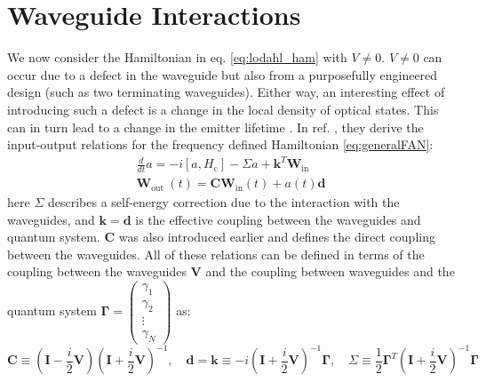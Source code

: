 \section{Waveguide Interactions \label{sec:waveguideIO}}
We now consider the Hamiltonian in eq. \eqref{eq:lodahl_ham} with $V \neq 0$. $V \neq 0$ can occur due to a defect in the waveguide but also from a purposefully engineered design (such as two terminating waveguides). Either way, an interesting effect of introducing such a defect is a change in the local density of optical states. This can in turn lead to a change in the emitter lifetime \cite{Joanesarson2020Few-photonGeometries}. In ref. \cite{Xu2016FanoTransport}, they derive the input-output relations for the frequency defined Hamiltonian \eqref{eq:generalFAN}:  
\begin{equation}
\begin{gathered}
\frac{d}{d t} a=-i\left[a, H_{\mathrm{c}}\right]-\Sigma a+\mathbf{k}^T \mathbf{W}_{\mathrm{in}} \\
\mathbf{W}_{\text {out }}(t)=\mathbf{C} \mathbf{W}_{\mathrm{in}}(t)+a(t)\mathbf{d}
\end{gathered}
\end{equation}
here $\Sigma$ describes a self-energy correction due to the interaction with the waveguides, and $\mathbf{k}=\mathbf{d}$ is the effective coupling between the waveguides and quantum system. $\mathbf{C}$ was also introduced earlier and defines the direct coupling between the waveguides. All of these relations can be defined in terms of the coupling between the waveguides $\mathbf{V}$ and the coupling between waveguides and the quantum system $\mathbf{\Gamma} = \begin{pmatrix}
    \gamma_1 \\
    \gamma_2 \\
    \vdots \\
    \gamma_N
\end{pmatrix}$ as:
\begin{equation}
\mathbf{C} \equiv\left(\mathbf{I}-\frac{i}{2} \mathbf{V}\right)\left(\mathbf{I}+\frac{i}{2} \mathbf{V}\right)^{-1}, \quad \mathbf{d} = \mathbf{k} \equiv-i\left(\mathbf{I}+\frac{i}{2} \mathbf{V}\right)^{-1} \mathbf{\Gamma}, \quad \Sigma \equiv \frac{1}{2} \mathbf{\Gamma}^T\left(\mathbf{I}+\frac{i}{2} \mathbf{V}\right)^{-1} \mathbf{\Gamma}
\end{equation}
